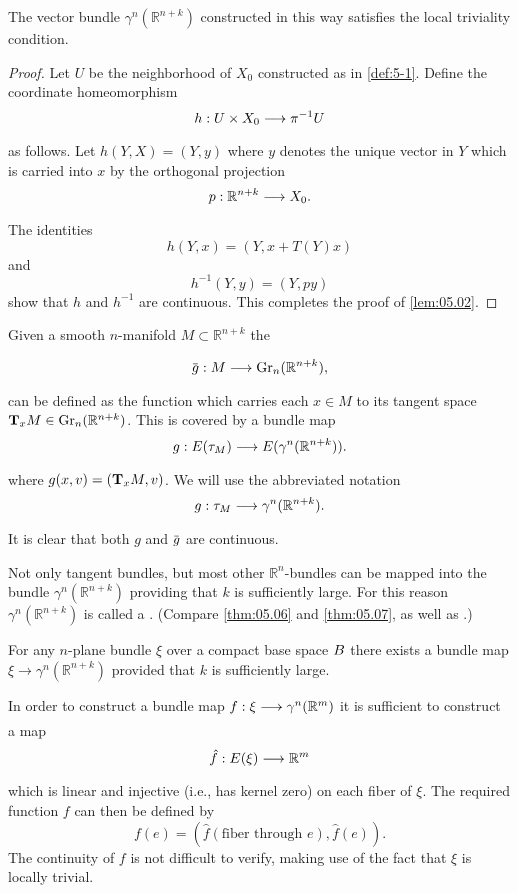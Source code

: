 \documentclass[../main]{subfiles}
\begin{document}
\begin{lemma}\label{lem:05.02}
	The vector bundle $\gamma^{n}(\mathbb{R}^{n+k})$ constructed in this way satisfies the local triviality condition.
\end{lemma}
\begin{proof}
	Let $U$ be the neighborhood of $X_{0}$ constructed as in \ref{def:5-1}. Define the coordinate homeomorphism
	\[h:U\times X_0\varrightarrow{}\pi\inv U
	\]
	as follows. Let $h(Y, X)=(Y, y)$ where $y$ denotes the unique vector in $Y$ which is carried into $x$ by the orthogonal projection
	\[p:\mathbb{R}^{n+k} \varrightarrow{}X_{0}. 
	\]
	The identities
	\[
	h(Y, x)=(Y, x+T(Y) x)
	\]
	and
	\[
	h^{-1}(Y, y)=(Y, py)
	\]
show that $h$ and $h^{-1}$ are continuous. This completes the proof of \ref{lem:05.02}.
\end{proof}

Given a smooth $n$-manifold $M \subset \mathbb{R}^{n+k}$ the 

\[\map{\xoverline{g}}{M}{\grassmannian_n (\mathbb{R}^{n+k})},
\]
can be defined as the function which carries each $x \in M$ to its tangent space $\tangentspace{M}{x} \in \grassmannian_n (\mathbb{R}^{n+k})$. This is covered by a bundle map
\[\map{g}{\total(\tangentbundle{M})}{\total(\gamma^{n}(\mathbb{R}^{n+k}))}.
\]
where $g(x, v)=(\tangentspace{M}{x}, v) $. We will use the abbreviated notation
\[\map{g}{\tangentbundle{M}}{\gamma^{n}(\mathbb{R}^{n+k})}.
\]
It is clear that both $g$ and $\xoverline{g}$ are continuous.

Not only tangent bundles, but most other $\mathbb{R}^{n}$-bundles can be mapped into the bundle $\gamma^{n}(\mathbb{R}^{n+k})$ providing that $k$ is sufficiently large. For this reason $\gamma^{n}(\mathbb{R}^{n+k})$ is called a . (Compare \ref{thm:05.06} and \ref{thm:05.07}, as well as \cite[$\S$ 19]{steenrodwhitehead1951}.)

\begin{lemma}\label{lem:05.03}
	For any $n$-plane bundle $\xi$ over a compact base space $\B $ there exists a bundle map $\xi \rightarrow \gamma^{n}(\mathbb{R}^{n+k})$ provided that $k$ is sufficiently large.
\end{lemma}

In order to construct a bundle map $\map{f}{\xi}{\gamma^{n}(\mathbb{R}^{m})}$ it is sufficient to construct a map
\[\map{\hat{f}}{\total(\xi)}{\mathbb{R}^{m}}
\]
which is linear and injective (i.e., has kernel zero) on each fiber of $\xi$. The required function $f$ can then be defined by
\[
f(e)=(\hat{f} (\text{fiber through } e), \hat{f}(e)).
\]
The continuity of $f$ is not difficult to verify, making use of the fact that $\xi$ is locally trivial.
\end{document}

